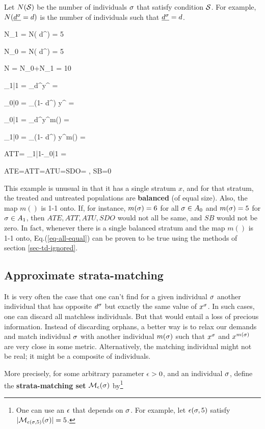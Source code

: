 Let $N({\cal S})$
be the number of individuals $\sigma$
that satisfy condition ${\cal S}$.
For example,
$N(\ul{ d^\s}= d)$
is the number of individuals
such that $\ul{ d^\s}= d$.

\beq
N_1
=
N( d^)
=
5
\eeq

\beq
N_0
=
N( d^)
=
5
\eeq

\beq
N
= N_0+N_1
=
10
\eeq



\beq
\caly_{1|1}
=
\sum_\s  d^\s y^\s
=
\eeq

\beq
\caly_{0|0}
=
\sum_\s (1- d^\s) y^\s
=
\eeq

\beq
\caly_{0|1}
=
\sum_\s  d^\s y^{m(\s)}
=
\eeq

\beq
\caly_{1|0}
=
\sum_\s (1- d^\s) y^{m(\s)}
=
\eeq

\beq
ATT=
\caly_{1|1}-\caly_{0|1}
=
\eeq

\beq
ATE=ATT=ATU=SDO=
\;,\;\; SB=0
\label{eq-all-equal}
\eeq

This example is unusual
in that it has a single
stratum $x$, and for
that stratum,
the treated and
untreated populations
are {\bf balanced} (of equal size).
Also, the map $m()$
is 1-1 onto.
If, for instance,
$m(\sigma)=6$ for all $\sigma\in A_0$
and $m(\sigma)=5$ for $\sigma\in A_1$,
then $ATE, ATT, ATU, SDO$
would not all be same, and
$SB$ would not be zero.
In fact, whenever there is a single
balanced stratum and the map $m()$
is 1-1 onto, Eq.(\ref{eq-all-equal})
can be proven to be true using
the methods of
section \ref{sec-td-ignored}.



\subsection{Approximate   strata-matching}

It is very often
the case that
one can't
find for a given
individual $\sigma$
another individual that has
opposite $ d^\sigma$ but
exactly the same value of $x^\sigma$.
In such cases, one can discard all
matchless individuals.
But that would entail a loss
of precious information.
Instead of discarding orphans,
a better way is to
relax our demands and
match individual $\sigma$
with another individual $m(\sigma)$
such that $x^\sigma$
and $x^{m(\sigma)}$ are very
close in some metric.
Alternatively, the matching
individual might
not be real; it might
be a composite
of individuals.

More precisely,
for some arbitrary
parameter $\epsilon>0$,
and an individual $\sigma$,
define
the {\bf  strata-matching set}
${\cal M}_{\epsilon}(\sigma)$ by\footnote{
One can use an $\epsilon$
that depends on $\sigma$.
For example, let $\epsilon(\sigma, 5)$
satisfy
$|{\cal M}_{\epsilon(\sigma, 5)}(\sigma)|=5$.}


